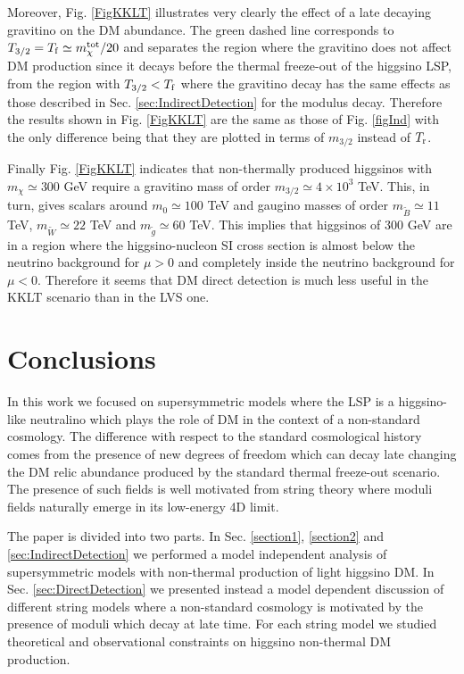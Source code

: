 \documentclass[11pt,a4paper]{article}
\begin{document}
Moreover, Fig. \ref{FigKKLT} illustrates very clearly the effect of a late decaying gravitino on the DM abundance. The green dashed line corresponds to $T_{3/2} = T_{\rm f} \simeq m_\chi^{\rm tot}/20$ and separates the region where the gravitino does not affect DM production since it decays before the thermal freeze-out of the higgsino LSP, from the region with $T_{3/2} < T_{\rm f}$ where the gravitino decay has the same effects as those described in Sec. \ref{sec:IndirectDetection} for the modulus decay. Therefore the results shown in Fig. \ref{FigKKLT} are the same as those of Fig. \ref{figInd} with the only difference being that they are plotted in terms of $m_{3/2}$ instead of $T_{\rm r}$. 

Finally Fig. \ref{FigKKLT} indicates that non-thermally produced higgsinos with $m_\chi \simeq 300$ GeV require a gravitino mass of order $m_{3/2}\simeq 4\times 10^3$ TeV. This, in turn, gives scalars around $m_0\simeq 100$ TeV and gaugino masses of order $m_{\tilde{B}}\simeq 11$ TeV, $m_{\tilde{W}}\simeq 22$ TeV and $m_{\tilde{g}}\simeq 60$ TeV. This implies that higgsinos of $300$ GeV are in a region where the higgsino-nucleon SI cross section is almost below the neutrino background for $\mu>0$ and completely inside the neutrino background for $\mu<0$. Therefore it seems that DM direct detection is much less useful in the KKLT scenario than in the LVS one. 


\section{Conclusions}
\label{sec:Conclusions}

In this work we focused on supersymmetric models where the LSP is a higgsino-like neutralino which plays the role of DM in the context of a non-standard cosmology. The difference with respect to the standard cosmological history comes from the presence of new degrees of freedom which can decay late changing the DM relic abundance produced by the standard thermal freeze-out scenario. The presence of such fields is well motivated from string theory where moduli fields naturally emerge in its low-energy 4D limit. 

The paper is divided into two parts. In Sec. \ref{section1}, \ref{section2} and \ref{sec:IndirectDetection} we performed a model independent analysis of supersymmetric models with non-thermal production of light higgsino DM. In Sec. \ref{sec:DirectDetection} we presented instead a model dependent discussion of different string models where a non-standard cosmology is motivated by the presence of moduli which decay at late time. For each string model we studied theoretical and observational constraints on higgsino  non-thermal DM production.
\end{document}
